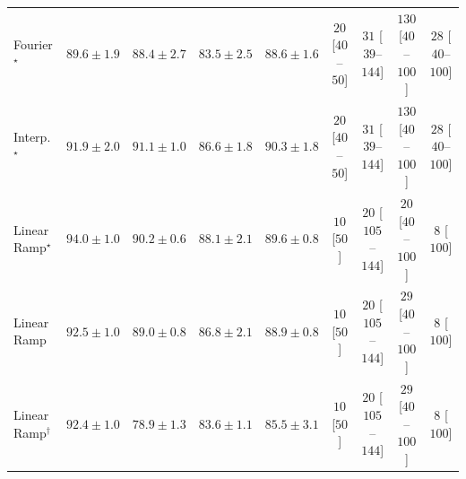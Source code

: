 \begin{tabular}{l|cccc|cccc|}
Fourier$^\star$ & {\cellcolor[HTML]{026A38}} \color[HTML]{F1F1F1} $89.6\pm 1.9$ & {\cellcolor[HTML]{0A703A}} \color[HTML]{F1F1F1} $88.4\pm 2.7$ & {\cellcolor[HTML]{298C48}} \color[HTML]{F1F1F1} $83.5\pm 2.5$ & {\cellcolor[HTML]{096F3A}} \color[HTML]{F1F1F1} $88.6\pm 1.6$ & {\cellcolor[HTML]{FFF3F0}} \color[HTML]{000000} $20$ [$40$--$50$] & {\cellcolor[HTML]{FEF1ED}} \color[HTML]{000000} $31$ [$39$--$144$] & {\cellcolor[HTML]{FDD8D5}} \color[HTML]{000000} $130$ [$40$--$100$] & {\cellcolor[HTML]{FEF1ED}} \color[HTML]{000000} $28$ [$40$--$100$] \\
Interp.$^\star$ & {\cellcolor[HTML]{005B32}} \color[HTML]{F1F1F1} $91.9\pm 2.0$ & {\cellcolor[HTML]{006034}} \color[HTML]{F1F1F1} $91.1\pm 1.0$ & {\cellcolor[HTML]{167A3F}} \color[HTML]{F1F1F1} $86.6\pm 1.8$ & {\cellcolor[HTML]{006636}} \color[HTML]{F1F1F1} $90.3\pm 1.8$ & {\cellcolor[HTML]{FFF3F0}} \color[HTML]{000000} $20$ [$40$--$50$] & {\cellcolor[HTML]{FEF1ED}} \color[HTML]{000000} $31$ [$39$--$144$] & {\cellcolor[HTML]{FDD8D5}} \color[HTML]{000000} $130$ [$40$--$100$] & {\cellcolor[HTML]{FEF1ED}} \color[HTML]{000000} $28$ [$40$--$100$] \\
Linear Ramp$^\star$ & {\cellcolor[HTML]{004D2C}} \color[HTML]{F1F1F1} $94.0\pm 1.0$ & {\cellcolor[HTML]{006636}} \color[HTML]{F1F1F1} $90.2\pm 0.6$ & {\cellcolor[HTML]{0C723B}} \color[HTML]{F1F1F1} $88.1\pm 2.1$ & {\cellcolor[HTML]{026A38}} \color[HTML]{F1F1F1} $89.6\pm 0.8$ & {\cellcolor[HTML]{FFF6F2}} \color[HTML]{000000} $10$ [$50$] & {\cellcolor[HTML]{FFF3F0}} \color[HTML]{000000} $20$ [$105$--$144$] & {\cellcolor[HTML]{FFF3F0}} \color[HTML]{000000} $20$ [$40$--$100$] & {\cellcolor[HTML]{FFF6F2}} \color[HTML]{000000} $8$ [$100$] \\
Linear Ramp & {\cellcolor[HTML]{005730}} \color[HTML]{F1F1F1} $92.5\pm 1.0$ & {\cellcolor[HTML]{066D39}} \color[HTML]{F1F1F1} $89.0\pm 0.8$ & {\cellcolor[HTML]{15793E}} \color[HTML]{F1F1F1} $86.8\pm 2.1$ & {\cellcolor[HTML]{076D39}} \color[HTML]{F1F1F1} $88.9\pm 0.8$ & {\cellcolor[HTML]{FFF6F2}} \color[HTML]{000000} $10$ [$50$] & {\cellcolor[HTML]{FFF3F0}} \color[HTML]{000000} $20$ [$105$--$144$] & {\cellcolor[HTML]{FEF1ED}} \color[HTML]{000000} $29$ [$40$--$100$] & {\cellcolor[HTML]{FFF6F2}} \color[HTML]{000000} $8$ [$100$] \\
Linear Ramp$^\dagger$ & {\cellcolor[HTML]{005830}} \color[HTML]{F1F1F1} $92.4\pm 1.0$ & {\cellcolor[HTML]{45AD5F}} \color[HTML]{F1F1F1} $78.9\pm 1.3$ & {\cellcolor[HTML]{298C48}} \color[HTML]{F1F1F1} $83.6\pm 1.1$ & {\cellcolor[HTML]{1D7F41}} \color[HTML]{F1F1F1} $85.5\pm 3.1$ & {\cellcolor[HTML]{FFF6F2}} \color[HTML]{000000} $10$ [$50$] & {\cellcolor[HTML]{FFF3F0}} \color[HTML]{000000} $20$ [$105$--$144$] & {\cellcolor[HTML]{FEF1ED}} \color[HTML]{000000} $29$ [$40$--$100$] & {\cellcolor[HTML]{FFF6F2}} \color[HTML]{000000} $8$ [$100$] \\

\end{tabular}
